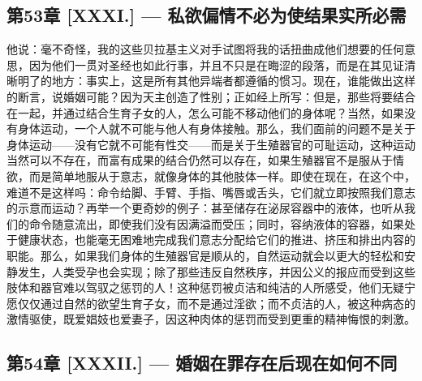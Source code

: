 
\subsection{第53章 [XXXI.] — 私欲偏情不必为使结果实所必需}

他说：毫不奇怪，我的这些贝拉基主义对手试图将我的话扭曲成他们想要的任何意思，因为他们一贯对圣经也如此行事，并且不只是在晦涩的段落，而是在其见证清晰明了的地方：事实上，这是所有其他异端者都遵循的惯习。现在，谁能做出这样的断言，说婚姻可能？因为天主创造了性别；正如经上所写：但是，那些将要结合在一起，并通过结合生育子女的人，怎么可能不移动他们的身体呢？当然，如果没有身体运动，一个人就不可能与他人有身体接触。那么，我们面前的问题不是关于身体运动——没有它就不可能有性交——而是关于生殖器官的可耻运动，这种运动当然可以不存在，而富有成果的结合仍然可以存在，如果生殖器官不是服从于情欲，而是简单地服从于意志，就像身体的其他肢体一样。即使在现在，在这个中，难道不是这样吗：命令给脚、手臂、手指、嘴唇或舌头，它们就立即按照我们意志的示意而运动？再举一个更奇妙的例子：甚至储存在泌尿容器中的液体，也听从我们的命令随意流出，即使我们没有因满溢而受压；同时，容纳液体的容器，如果处于健康状态，也能毫无困难地完成我们意志分配给它们的推进、挤压和排出内容的职能。那么，如果我们身体的生殖器官是顺从的，自然运动就会以更大的轻松和安静发生，人类受孕也会实现；除了那些违反自然秩序，并因公义的报应而受到这些肢体和器官难以驾驭之惩罚的人！这种惩罚被贞洁和纯洁的人所感受，他们无疑宁愿仅仅通过自然的欲望生育子女，而不是通过淫欲；而不贞洁的人，被这种病态的激情驱使，既爱娼妓也爱妻子，因这种肉体的惩罚而受到更重的精神悔恨的刺激。\par


\subsection{第54章 [XXXII.] — 婚姻在罪存在后现在如何不同}

